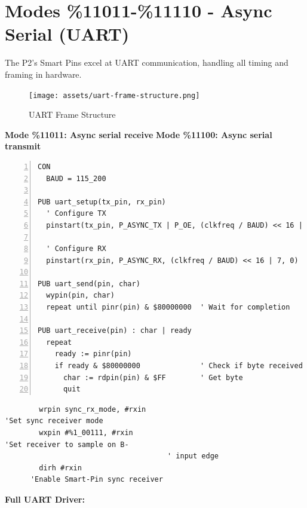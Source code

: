 \documentclass[11pt,a4paper,oneside,english]{book}
\begin{document}
\clearpage

\hypertarget{modes-11011-11110---async-serial-uart}{%
\section{Modes \%11011-\%11110 - Async Serial
(UART)}\label{modes-11011-11110---async-serial-uart}}

The P2's Smart Pins excel at UART communication, handling all timing and
framing in hardware.

\begin{figure}
\centering
\texttt{[image: assets/uart-frame-structure.png]}
\caption{UART Frame Structure}
\end{figure}

\textbf{Mode \%11011: Async serial receive} \textbf{Mode \%11100: Async
serial transmit}

\begin{Spin2Block}
\begin{Verbatim}[numbers=left,numbersep=5pt,xleftmargin=15pt]
CON
  BAUD = 115_200
  
PUB uart_setup(tx_pin, rx_pin)
  ' Configure TX
  pinstart(tx_pin, P_ASYNC_TX | P_OE, (clkfreq / BAUD) << 16 | 7, 0)
  
  ' Configure RX
  pinstart(rx_pin, P_ASYNC_RX, (clkfreq / BAUD) << 16 | 7, 0)

PUB uart_send(pin, char)
  wypin(pin, char)
  repeat until pinr(pin) & $80000000  ' Wait for completion

PUB uart_receive(pin) : char | ready
  repeat
    ready := pinr(pin)
    if ready & $80000000              ' Check if byte received
      char := rdpin(pin) & $FF        ' Get byte
      quit
\end{Verbatim}
\end{Spin2Block}

\begin{PASM2Block}
\begin{lstlisting}
        wrpin sync_rx_mode, #rxin
'Set sync receiver mode
        wxpin #%1_00111, #rxin
'Set receiver to sample on B-
                                      ' input edge
        dirh #rxin
      'Enable Smart-Pin sync receiver
\end{lstlisting}
\end{PASM2Block}

\textbf{Full UART Driver:}
\end{document}
